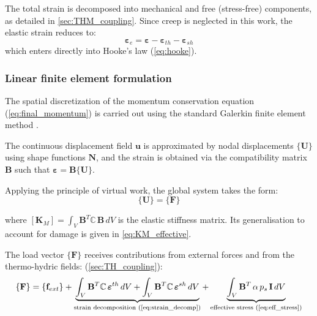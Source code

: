 The total strain is decomposed into mechanical and free (stress-free) components, as detailed in \cref{sec:THM_coupling}. Since creep is neglected in this work, the elastic strain reduces to:
\begin{equation}
    \boldsymbol{\varepsilon}_e = \boldsymbol{\varepsilon} - \boldsymbol{\varepsilon}_{th} - \boldsymbol{\varepsilon}_{sh}
    \label{eq:eps_elastic}
\end{equation}
which enters directly into Hooke's law (\cref{eq:hooke}).

\subsubsection{Linear finite element formulation}

The spatial discretization of the momentum conservation equation (\cref{eq:final_momentum}) is carried out using the standard Galerkin finite element method \cite{dalpont2020}. 

The continuous displacement field $\mathbf{u}$ is approximated by nodal displacements $\{\mathbf{U}\}$ using shape functions $\mathbf{N}$, and the strain is obtained via the compatibility matrix $\mathbf{B}$ such that $\boldsymbol{\varepsilon} = \mathbf{B}\{\mathbf{U}\}$.

Applying the principle of virtual work, the global system takes the form:
\begin{equation}
    [\mathbf{K}_M]\{\mathbf{U}\} = \{\mathbf{F}\}
    \label{eq:KMU_F}
\end{equation}

where $[\mathbf{K}_M] = \int_V \mathbf{B}^T \mathbb{C}\,\mathbf{B}\,dV$ is the elastic stiffness matrix. Its generalisation to account for damage is given in \cref{eq:KM_effective}.

The load vector $\{\mathbf{F}\}$ receives contributions from external forces and from the thermo-hydric fields: (\cref{sec:TH_coupling}):
\begin{equation}
    \{\mathbf{F}\} = \{\mathbf{f}_{ext}\}
    + \underbrace{
        \int_V \mathbf{B}^T \mathbb{C}\,
        \boldsymbol{\varepsilon}^{th}\,dV
        + \int_V \mathbf{B}^T \mathbb{C}\,
        \boldsymbol{\varepsilon}^{sh}\,dV
      }_{\text{strain decomposition 
         (\cref{eq:strain_decomp})}}
    + \underbrace{
        \int_V \mathbf{B}^T\,
        \alpha\, p_s\,
        \mathbf{I}\,dV
      }_{\text{effective stress 
         (\cref{eq:eff_stress})}}
    \label{eq:F_full}
\end{equation}

